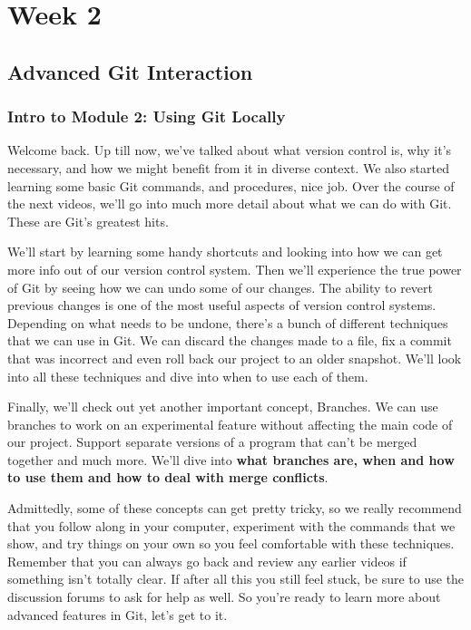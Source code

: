 %
%
%
\chapter{Week 2}

\section{Advanced Git Interaction}

	\subsection{Intro to Module 2: Using Git Locally}
	
	Welcome back. Up till now, we've talked about what version control is, why it's necessary, and how we might benefit from it in diverse context. We also started learning some basic Git commands, and procedures, nice job. Over the course of the next videos, we'll go into much more detail about what we can do with Git. 
	These are Git's greatest hits. 
	
	We'll start by learning some handy shortcuts and looking into how we can get more info out  of our version control system. Then we'll experience the true power of Git by seeing how we can undo some of our changes. The ability to revert previous changes is one of the most useful aspects of version control systems. Depending on what needs to be undone, there's a bunch of different techniques that we can use in Git. We can discard the changes made to a file, fix a commit that was incorrect and even roll back our project to an older snapshot. We'll look into all these techniques and dive into when to use each of them. 
	
	Finally, we'll check out yet another important concept, Branches. We can use branches to work on an experimental feature without affecting the main code of our project. Support separate versions of a program that can't be merged together and much more. We'll dive into \textbf{what branches are, when and how to use them and how to deal with merge conflicts}. 
	
	Admittedly, some of these concepts can get pretty tricky, so we really recommend that you follow along in your computer, experiment with the commands that we show, and try things on your own so you feel comfortable with these techniques. Remember that you can always go back and review any earlier videos if something isn't totally clear. If after all this you still feel stuck, be sure to use the discussion forums to ask for help as well. So you're ready to learn more about advanced features in Git, let's get to it.
	
